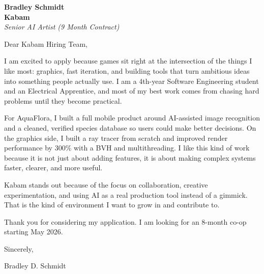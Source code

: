 \documentclass[11pt]{article}
\begin{document}
\textbf{Bradley Schmidt}\\
\vspace{0.5em}
\textbf{Kabam}\\
\textit{Senior AI Artist  (9 Month Contract)}

Dear Kabam Hiring Team,

\par

I am excited to apply because games sit right at the intersection of the things I like most: graphics, fast iteration, and building tools that turn ambitious ideas into something people actually use. I am a 4th-year Software Engineering student and an Electrical Apprentice, and most of my best work comes from chasing hard problems until they become practical.

\par

For AquaFlora, I built a full mobile product around AI-assisted image recognition and a cleaned, verified species database so users could make better decisions. On the graphics side, I built a ray tracer from scratch and improved render performance by 300\% with a BVH and multithreading. I like this kind of work because it is not just about adding features, it is about making complex systems faster, clearer, and more useful.

\par

Kabam stands out because of the focus on collaboration, creative experimentation, and using AI as a real production tool instead of a gimmick. That is the kind of environment I want to grow in and contribute to.

\par

Thank you for considering my application. I am looking for an 8-month co-op starting May 2026.

\par

Sincerely,

\par

Bradley D. Schmidt
\end{document}
